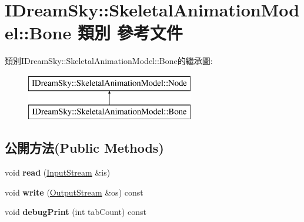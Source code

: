 \hypertarget{class_i_dream_sky_1_1_skeletal_animation_model_1_1_bone}{}\section{I\+Dream\+Sky\+:\+:Skeletal\+Animation\+Model\+:\+:Bone 類別 參考文件}
\label{class_i_dream_sky_1_1_skeletal_animation_model_1_1_bone}
類別\+I\+Dream\+Sky\+:\+:Skeletal\+Animation\+Model\+:\+:Bone的繼承圖\+:\begin{figure}[H]
\begin{center}
\leavevmode
\includegraphics[height=2.000000cm]{class_i_dream_sky_1_1_skeletal_animation_model_1_1_bone}
\end{center}
\end{figure}
\subsection*{公開方法(Public Methods)}
\begin{DoxyCompactItemize}
\item 
void {\bfseries read} (\hyperlink{class_i_dream_sky_1_1_input_stream}{Input\+Stream} \&is)\hypertarget{class_i_dream_sky_1_1_skeletal_animation_model_1_1_bone_ad9d95b5ae2e9c26b9de8dc5586e844ce}{}\label{class_i_dream_sky_1_1_skeletal_animation_model_1_1_bone_ad9d95b5ae2e9c26b9de8dc5586e844ce}

\item 
void {\bfseries write} (\hyperlink{class_i_dream_sky_1_1_output_stream}{Output\+Stream} \&os) const \hypertarget{class_i_dream_sky_1_1_skeletal_animation_model_1_1_bone_a72df16f159f69cf8fd2c33cd237052db}{}\label{class_i_dream_sky_1_1_skeletal_animation_model_1_1_bone_a72df16f159f69cf8fd2c33cd237052db}

\item 
void {\bfseries debug\+Print} (int tab\+Count) const \hypertarget{class_i_dream_sky_1_1_skeletal_animation_model_1_1_bone_ad8ce0231eef776d9217ab036af928bf0}{}\label{class_i_dream_sky_1_1_skeletal_animation_model_1_1_bone_ad8ce0231eef776d9217ab036af928bf0}

\end{DoxyCompactItemize}
